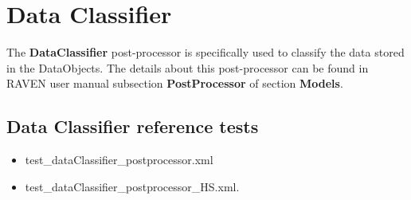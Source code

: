 \section{Data Classifier}
\label{sec:dataClassifier}

The \textbf{DataClassifier} post-processor is specifically used to classify the data stored in the DataObjects.
The details about this post-processor can be found in RAVEN user manual subsection \textbf{PostProcessor}
of section \textbf{Models}.

\subsection{Data Classifier reference tests}
\begin{itemize}
	\item test\_dataClassifier\_postprocessor.xml
  \item test\_dataClassifier\_postprocessor\_HS.xml.
\end{itemize}
